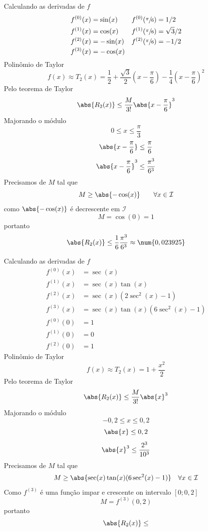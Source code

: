 \begin{exercises}
\begin{exercise}
\begin{answer}
\begin{alphalist}
			\item Calculando as derivadas de $f$
			\begin{align*}
				f^{(0)}(x) & =  \sin(x) & f^{(0)}(\sfrac{\pi}{6}) & = 1/2        \\
				f^{(1)}(x) & =  \cos(x) & f^{(1)}(\sfrac{\pi}{6}) & = \sqrt{3}/2 \\
				f^{(2)}(x) & = -\sin(x) & f^{(2)}(\sfrac{\pi}{6}) & = -1/2       \\
				f^{(3)}(x) & = -\cos(x) &
			\end{align*}
			Polinômio de Taylor
			\[
			f(x) \approx T_2(x)
			= \frac{1}{2}
			+ \frac{\sqrt{3}}{2}\left(x-\frac{\pi}{6}\right)
			- \frac{1}{4}\left(x-\frac{\pi}{6}\right)^2
			\]
			Pelo teorema de Taylor
			\[ \abs{R_2(x)} \leq \frac{M}{3!}\abs{x-\frac{\pi}{6}}^3 \]
			Majorando o módulo
			\[ 0 \leq x \leq \frac{\pi}{3} \]
			\[ \abs{x-\frac{\pi}{6}}   \leq \frac{\pi}{6} \]
			\[ \abs{x-\frac{\pi}{6}}^3 \leq \frac{\pi^3}{6^3} \]
			Precisamos de $M$ tal que
			\[ M \geq \abs{-\cos(x)} \qquad \forall x\in \mathcal{I} \]
			como \(\abs{-\cos(x)}\) é decrescente em $\mathcal{I}$
			\[ M = \cos(0) = 1 \]
			portanto
			\[ \abs{R_2(x)} \leq \frac{1}{6}\frac{\pi^3}{6^3} \approx \num{0,023925}  \]

			\item Calculando as derivadas de $f$
			\begin{align*}
				f^{(0)}(x) & = \sec(x)                      \\
				f^{(1)}(x) & = \sec(x)\tan(x)               \\
				f^{(2)}(x) & = \sec(x)(2\sec^2(x)-1)        \\
				f^{(3)}(x) & = \sec(x)\tan(x)(6\sec^2(x)-1) \\[2mm]
				f^{(0)}(0) & = 1 \\
				f^{(1)}(0) & = 0 \\
				f^{(2)}(0) & = 1
			\end{align*}
			Polinômio de Taylor
			\[ f(x) \approx T_2(x) = 1 +\frac{x^2}{2}  \]
			Pelo teorema de Taylor
			\[ \abs{R_2(x)} \leq \frac{M}{3!}\abs{x}^3 \]
			Majorando o módulo
			\[ -0,2 \leq x \leq 0,2 \]
			\[ \abs{x}   \leq 0,2 \]
			\[ \abs{x}^3 \leq \frac{2^3}{10^3} \]
			Precisamos de $M$ tal que
			\[ M \geq \abs{\sec(x)\tan(x)(6\sec^2(x)-1)} \quad \forall x\in \mathcal{I} \]
			Como $f^{(3)}$ é uma função impar e crescente on intervalo $[0;0,2]$
			\[ M = f^{(3)}(0,2) \]
			portanto
			\[ \abs{R_2(x)} \leq \]


\end{alphalist}
\end{answer}
\end{exercise}
\end{exercises}
